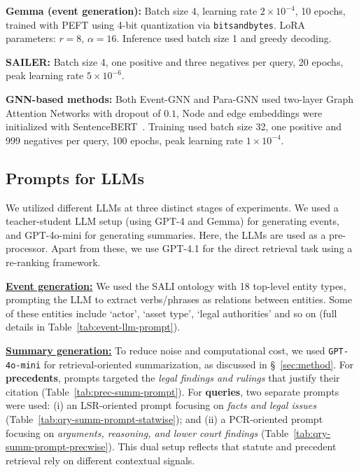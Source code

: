 \noindent\textbf{Gemma (event generation):} Batch size 4, learning rate $2\times10^{-4}$, 10 epochs, trained with PEFT using 4-bit quantization via \texttt{bitsandbytes}. LoRA parameters: $r=8$, $\alpha=16$. Inference used batch size 1 and greedy decoding.  

\noindent\textbf{SAILER:} Batch size 4, one positive and three negatives per query, 20 epochs, peak learning rate $5\times10^{-6}$.  

\noindent\textbf{GNN-based methods:} Both Event-GNN and Para-GNN used two-layer Graph Attention Networks with dropout of $0.1$, Node and edge embeddings were initialized with SentenceBERT~\citep{reimers2019sentencebert}. Training used batch size 32, one positive and 999 negatives per query, 100 epochs, peak learning rate $1\times10^{-4}$.  



\subsection{Prompts for LLMs} \label{app:prompts}
We utilized different LLMs at three distinct stages of experiments. We used a teacher-student LLM setup (using GPT-4 and Gemma) for generating events, and GPT-4o-mini for generating summaries. Here, the LLMs are used as a pre-processor. Apart from these, we use GPT-4.1 for the direct retrieval task using a re-ranking framework.

\vspace{1mm}
\noindent \underline{\bf Event generation:} We used the SALI ontology with 18 top-level entity types, prompting the LLM to extract verbs/phrases as relations between entities. Some of these entities include `actor', `asset type', `legal authorities' and so on (full details in Table~\ref{tab:event-llm-prompt}).

\vspace{1mm}
\noindent \underline{\bf Summary generation:} To reduce noise and computational cost, we used \texttt{GPT-4o-mini} for retrieval-oriented summarization, as discussed in \S~\ref{sec:method}.  
For \textbf{precedents}, prompts targeted the \textit{legal findings and rulings} that justify their citation (Table~\ref{tab:prec-summ-prompt}).  
For \textbf{queries}, two separate prompts were used: (i) an LSR-oriented prompt focusing on \textit{facts and legal issues} (Table~\ref{tab:qry-summ-prompt-statwise}); and (ii) a PCR-oriented prompt focusing on \textit{arguments, reasoning, and lower court findings} (Table~\ref{tab:qry-summ-prompt-precwise}). This dual setup reflects that statute and precedent retrieval rely on different contextual signals.  

